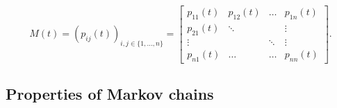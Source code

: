 \begin{equation}
\label{eq:trans-matrix}
M(t) = (p_{ij}(t))_{i,j \in \{1,...,n\}} = \begin{bmatrix}
p_{11}(t) & p_{12}(t) & \hdots  & p_{1n}(t)\\
p_{21}(t) & \ddots &  & \vdots \\
\vdots &  & \ddots & \vdots \\
p_{n1}(t) & \hdots & \hdots & p_{nn}(t)
\end{bmatrix}.
\end{equation}



\subsection{Properties of Markov chains}
\label{sec:markov-properties}

